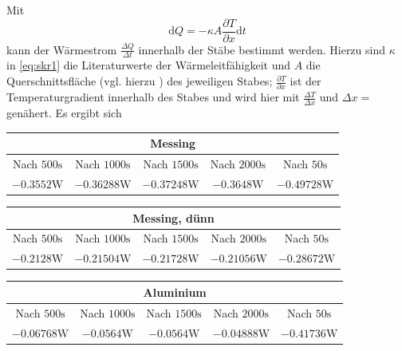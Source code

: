 Mit 
\begin{equation}
	\mathup{d}Q = -\kappa A\frac{\partial T}{\partial x}\mathup{d}t
	\label{eq:skr1}
\end{equation}
kann der Wärmestrom $\frac{\Delta{Q}}{\Delta{t}}$ innerhalb der Stäbe bestimmt werden. 
Hierzu sind $\kappa$ in \ref{eq:skr1} die Literaturwerte der Wärmeleitfähigkeit und $A$ die Querschnittsfläche (vgl. hierzu \cite{V204}) des jeweiligen Stabes; $\frac{\partial T}{\partial x}$ ist der Temperaturgradient innerhalb des Stabes und wird hier mit $\frac{\Delta T}{\Delta x}$ und $\Delta x=$genähert.
Es ergibt sich\\
\begin{table}
\centering
\begin{tabular}{ccccc}
	\multicolumn{5}{c}{Messing}\\
	\toprule
	Nach $500\si{\second}$&Nach $1000\si{\second}$& Nach $1500\si{\second}$&Nach $2000\si{\second}$& Nach $50\si{\second}$\\
	$-0.3552\si{\watt}$&$-0.36288\si{\watt}$&$-0.37248\si{\watt}$&$-0.3648\si{\watt}$&$-0.49728\si{\watt}$\\
	\bottomrule
\end{tabular}
\end{table}
\begin{table}[h!]
\centering
\begin{tabular}{ccccc}
	\multicolumn{5}{c}{Messing, dünn}\\
	\toprule
	Nach $500\si{\second}$&Nach $1000\si{\second}$& Nach $1500\si{\second}$&Nach $2000\si{\second}$& Nach $50\si{\second}$\\
	$-0.2128\si{\watt}$&$-0.21504\si{\watt}$&$-0.21728\si{\watt}$&$-0.21056\si{\watt}$&$-0.28672\si{\watt}$\\
	\bottomrule
\end{tabular}
\end{table}
\begin{table}[h!]
\centering
\begin{tabular}{ccccc}
	\multicolumn{5}{c}{Aluminium}\\
	\toprule
	Nach $500\si{\second}$&Nach $1000\si{\second}$& Nach $1500\si{\second}$&Nach $2000\si{\second}$& Nach $50\si{\second}$\\

	$-0.06768\si{\watt}$&$-0.0564\si{\watt}$&$-0.0564\si{\watt}$&$-0.04888\si{\watt}$&$-0.41736\si{\watt}$\\
	\bottomrule
\end{tabular}
\end{table}
